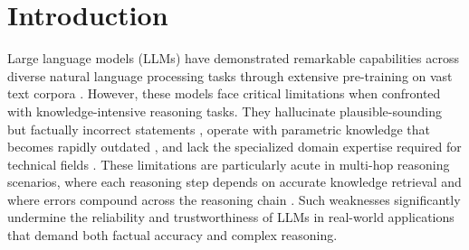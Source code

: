 \documentclass[sigconf]{acmart}
\begin{document}



\maketitle

\section{Introduction}

Large language models (LLMs) have demonstrated remarkable capabilities across diverse natural language processing tasks through extensive pre-training on vast text corpora \citep{brown2020language, kojima2022large, wei2022chain, dubey2024llama}. However, these models face critical limitations when confronted with knowledge-intensive reasoning tasks. They hallucinate plausible-sounding but factually incorrect statements \citep{tonmoy2024comprehensive, huang2025survey}, operate with parametric knowledge that becomes rapidly outdated \citep{liska2022streamingqa, kasai2023realtime}, and lack the specialized domain expertise required for technical fields \citep{singhal2023large, kandpal2023large}. These limitations are particularly acute in multi-hop reasoning scenarios, where each reasoning step depends on accurate knowledge retrieval and where errors compound across the reasoning chain \citep{lightman2023let, ling2023deductive}. Such weaknesses significantly undermine the reliability and trustworthiness of LLMs in real-world applications that demand both factual accuracy and complex reasoning.
\end{document}
